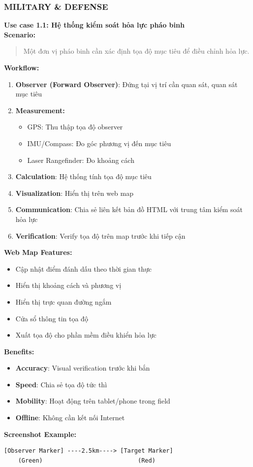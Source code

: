 \begin{itemize}
\subsubsection{MILITARY \& DEFENSE}
\textbf{Use case 1.1: Hệ thống kiểm soát hỏa lực pháo binh} \\

\textbf{Scenario:}
\begin{quote}
Một đơn vị pháo binh cần xác định tọa độ mục tiêu để điều chỉnh hỏa lực.
\end{quote}

\textbf{Workflow:}
\begin{enumerate}
    \item \textbf{Observer (Forward Observer)}: Đứng tại vị trí cần quan sát, quan sát mục tiêu
    \item \textbf{Measurement:}
    \begin{itemize}
        \item GPS: Thu thập tọa độ observer
        \item IMU/Compass: Đo góc phương vị đến mục tiêu
        \item Laser Rangefinder: Đo khoảng cách
    \end{itemize}
    \item \textbf{Calculation}: Hệ thống tính tọa độ mục tiêu
    \item \textbf{Visualization}: Hiển thị trên web map
    \item \textbf{Communication}: Chia sẻ liên kết bản đồ HTML với trung tâm kiểm soát hỏa lực
    \item \textbf{Verification}: Verify tọa độ trên map trước khi tiếp cận
\end{enumerate}
\textbf{Web Map Features:}
\begin{itemize}[label=\textbullet]
    \item Cập nhật điểm đánh dấu theo thời gian thực
    \item Hiển thị khoảng cách và phương vị
    \item Hiển thị trực quan đường ngắm
    \item Cửa sổ thông tin tọa độ
    \item Xuất tọa độ cho phần mềm điều khiển hỏa lực
\end{itemize}
\textbf{Benefits:}
\begin{itemize}[label=\textbullet]
    \item \textbf{Accuracy}: Visual verification trước khi bắn
    \item \textbf{Speed}: Chia sẻ tọa độ tức thì
    \item \textbf{Mobility}: Hoạt động trên tablet/phone trong field
    \item \textbf{Offline}: Không cần kết nối Internet
\end{itemize}
\textbf{Screenshot Example:}
\begin{verbatim}
[Observer Marker] ----2.5km----> [Target Marker]
    (Green)                           (Red)



\end{verbatim}
\end{itemize}
